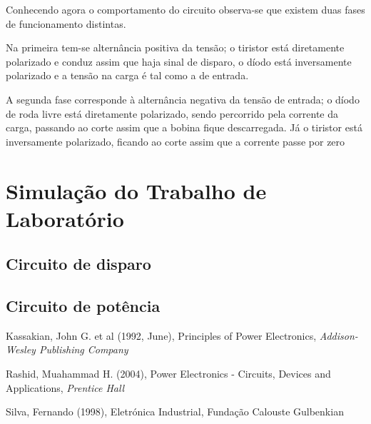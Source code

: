 \documentclass[a4paper,11pt]{article}
\numberwithin{equation}{section}
\begin{document}
Conhecendo agora o comportamento do circuito observa-se que existem duas fases de funcionamento distintas.

Na primeira tem-se alternância positiva da tensão; o tiristor está diretamente polarizado e conduz assim que haja sinal de disparo, o díodo está inversamente polarizado e a tensão na carga é tal como a de entrada.

A segunda fase corresponde à alternância negativa da tensão de entrada; o díodo de roda livre está diretamente polarizado, sendo percorrido pela corrente da carga, passando ao corte assim que a bobina fique descarregada. Já o tiristor está inversamente polarizado, ficando ao corte assim que a corrente passe por zero

\section{Simulação do Trabalho de Laboratório}


\subsection{Circuito de disparo}

\subsection{Circuito de potência}

\pagebreak

\begin{thebibliography}{2}
	
	Kassakian, John G. et al (1992, June), Principles of Power Electronics, \textit{Addison-Wesley Publishing Company}

	Rashid, Muahammad H. (2004), Power Electronics - Circuits, Devices and Applications, \textit{Prentice Hall}
	
	Silva, Fernando (1998), Eletrónica Industrial, Fundação Calouste Gulbenkian
	
\end{thebibliography}


\pagebreak
\end{document}
